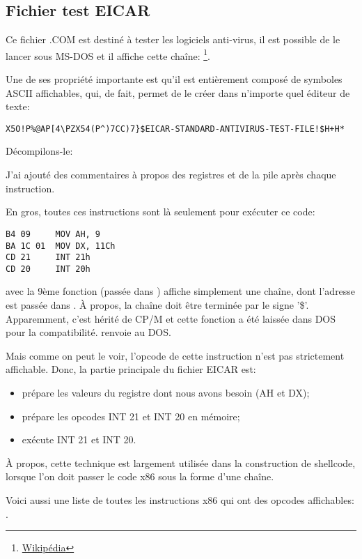 
\subsection{ Fichier test EICAR}
\label{subsec:EICAR}

Ce fichier .COM est destiné à tester les logiciels anti-virus, il est possible de
le lancer sous MS-DOS et il affiche cette chaîne: 
\footnote{\href{http://go.yurichev.com/17006}{Wikipédia}}.

Une de ses propriété importante est qu'il est entièrement composé de symboles ASCII
affichables, qui, de fait, permet de le créer dans n'importe quel éditeur de texte:

\begin{lstlisting}
X5O!P%@AP[4\PZX54(P^)7CC)7}$EICAR-STANDARD-ANTIVIRUS-TEST-FILE!$H+H*
\end{lstlisting}

Décompilons-le:



J'ai ajouté des commentaires à propos des registres et de la pile après chaque instruction.

En gros, toutes ces instructions sont là seulement pour exécuter ce code:

\begin{lstlisting}[style=customasmx86]
B4 09     MOV AH, 9
BA 1C 01  MOV DX, 11Ch
CD 21     INT 21h
CD 20     INT 20h
\end{lstlisting}

 avec la 9ème fonction (passée dans ) affiche simplement une chaîne,
dont l'adresse est passée dans .
À propos, la chaîne doit être terminée par le signe '\$'.
Apparemment, c'est hérité de \gls{CP/M} et cette fonction a été laissée dans DOS
pour la compatibilité.
 renvoie au DOS.

Mais comme on peut le voir, l'opcode de cette instruction n'est pas strictement
affichable.
Donc, la partie principale du fichier EICAR est:

\begin{itemize}
\item prépare les valeurs du registre dont nous avons besoin (AH et DX);
\item prépare les opcodes INT 21 et INT 20 en mémoire;
\item exécute INT 21 et INT 20.
\end{itemize}


À propos, cette technique est largement utilisée dans la construction de shellcode,
lorsque l'on doit passer le code x86 sous la forme d'une chaîne.

Voici aussi une liste de toutes les instructions x86 qui ont des opcodes affichables:
.
